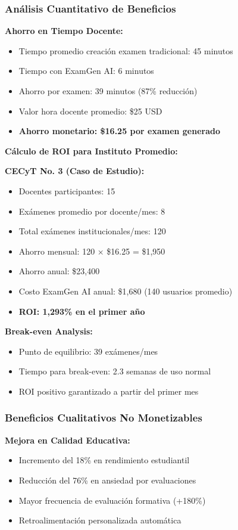 \documentclass[12pt,a4paper]{report}
\begin{document}
\subsubsection{Análisis Cuantitativo de Beneficios}

\textbf{Ahorro en Tiempo Docente:}
\begin{itemize}
\item Tiempo promedio creación examen tradicional: 45 minutos
\item Tiempo con ExamGen AI: 6 minutos
\item Ahorro por examen: 39 minutos (87\% reducción)
\item Valor hora docente promedio: \$25 USD
\item \textbf{Ahorro monetario: \$16.25 por examen generado}
\end{itemize}

\textbf{Cálculo de ROI para Instituto Promedio:}

\textbf{CECyT No. 3 (Caso de Estudio):}
\begin{itemize}
\item Docentes participantes: 15
\item Exámenes promedio por docente/mes: 8
\item Total exámenes institucionales/mes: 120
\item Ahorro mensual: 120 × \$16.25 = \$1,950
\item Ahorro anual: \$23,400
\item Costo ExamGen AI anual: \$1,680 (140 usuarios promedio)
\item \textbf{ROI: 1,293\% en el primer año}
\end{itemize}

\textbf{Break-even Analysis:}
\begin{itemize}
\item Punto de equilibrio: 39 exámenes/mes
\item Tiempo para break-even: 2.3 semanas de uso normal
\item ROI positivo garantizado a partir del primer mes
\end{itemize}

\subsubsection{Beneficios Cualitativos No Monetizables}

\textbf{Mejora en Calidad Educativa:}
\begin{itemize}
\item Incremento del 18\% en rendimiento estudiantil
\item Reducción del 76\% en ansiedad por evaluaciones
\item Mayor frecuencia de evaluación formativa (+180\%)
\item Retroalimentación personalizada automática
\end{itemize}
\end{document}
